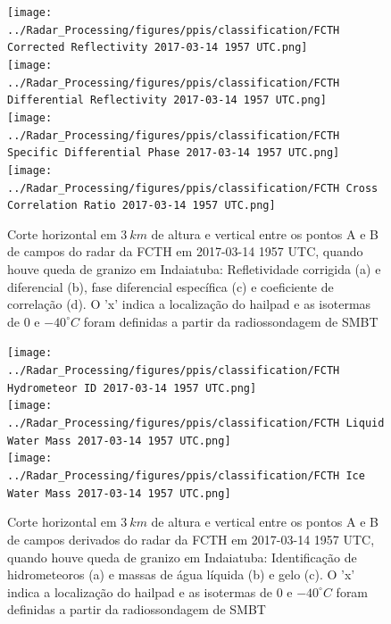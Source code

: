 \begin{figure}[hp]
	\centering
	\caption{Corte horizontal em $3\:km$ de altura e vertical entre os pontos A e B de campos do radar da FCTH em 2017-03-14 1957 UTC, quando houve queda de granizo em Indaiatuba: Refletividade corrigida (a) e diferencial (b), fase diferencial específica (c) e coeficiente de correlação (d). O 'x' indica a localização do hailpad e as isotermas de $0$ e $-40^{\circ}C$ foram definidas a partir da radiossondagem de SMBT}
	\label{radar_20170314_2}
	\vspace{-5pt}
	\texttt{[image: ../Radar\_Processing/figures/ppis/classification/FCTH Corrected Reflectivity 2017-03-14 1957 UTC.png]}
	\label{z_20170314_2} \\
	\vspace{-15pt}
	\texttt{[image: ../Radar\_Processing/figures/ppis/classification/FCTH Differential Reflectivity 2017-03-14 1957 UTC.png]}
	\label{zdr_20170314_2} \\
	\vspace{-15pt}
	\texttt{[image: ../Radar\_Processing/figures/ppis/classification/FCTH Specific Differential Phase 2017-03-14 1957 UTC.png]}
	\label{kdp_20170314_2} \\
	\vspace{-15pt}
	\texttt{[image: ../Radar\_Processing/figures/ppis/classification/FCTH Cross Correlation Ratio 2017-03-14 1957 UTC.png]}
	\label{rho_20170314_2} \\
	\vspace{-5pt}
\end{figure}

\begin{figure}[htb]
	\centering
	\caption{Corte horizontal em $3\:km$ de altura e vertical entre os pontos A e B de campos derivados do radar da FCTH em 2017-03-14 1957 UTC, quando houve queda de granizo em Indaiatuba: Identificação de hidrometeoros (a) e massas de água líquida (b) e gelo (c). O 'x' indica a localização do hailpad e as isotermas de $0$ e $-40^{\circ}C$ foram definidas a partir da radiossondagem de SMBT} 
	\label{radar_derived_20170314_2}
	\vspace{-5pt}
	\texttt{[image: ../Radar\_Processing/figures/ppis/classification/FCTH Hydrometeor ID 2017-03-14 1957 UTC.png]}
	\label{hid_20170314_2} \\
	\vspace{-15pt}
	\texttt{[image: ../Radar\_Processing/figures/ppis/classification/FCTH Liquid Water Mass 2017-03-14 1957 UTC.png]}
	\label{ml_20170314_2} \\
	\vspace{-15pt}
	\texttt{[image: ../Radar\_Processing/figures/ppis/classification/FCTH Ice Water Mass 2017-03-14 1957 UTC.png]}
	\label{mi_20170314_2} \\
	\vspace{-5pt}
\end{figure}

